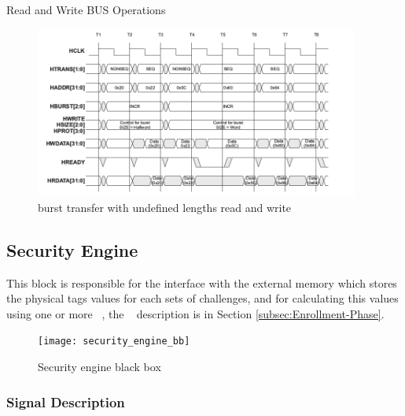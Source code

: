 \begin{subsubsection}{Read and Write BUS Operations}
\label{op:rw}


  \begin{figure}[H]
    \centering
    \includegraphics[width=0.95\textwidth]{figures/others/undef_burst_length.png}
    \caption{burst transfer with undefined lengths read and write }
    \label{fig:ublsm}
\end{figure}

\end{subsubsection}






\subsection{Security Engine}

This block is responsible for the interface with the external memory which stores the physical tags values
for each sets of challenges, and for calculating this values using one or more \pufs~, the \puf~ description is in Section \ref{subsec:Enrollment-Phase}.


\begin{figure}[!ht]
	\centering
	\texttt{[image: security\_engine\_bb]}
    \caption{Security engine  black box  }
	\label{fig:sebb}
\end{figure}




\subsubsection{Signal Description}

